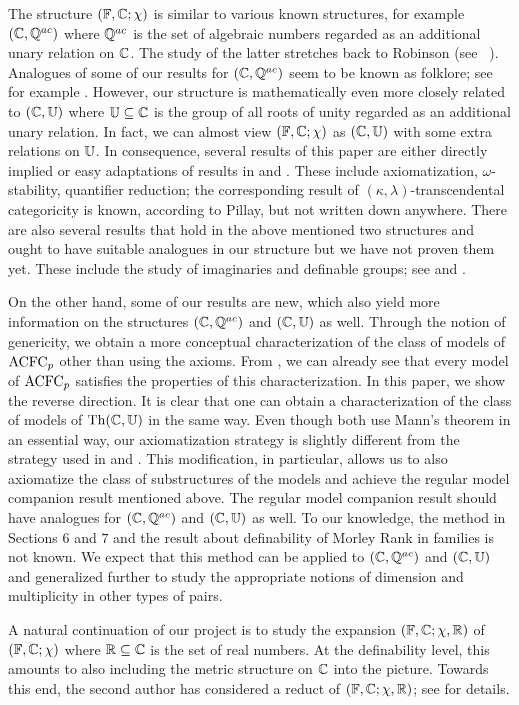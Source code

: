 \noindent
The structure $(\mathbb{F}, \mathbb{C}; \chi)$ is similar to various known structures, 
for example $(\mathbb{C}, \mathbb{Q}^{ac})$ where $\mathbb{Q}^{ac}$ is the set of algebraic numbers regarded as an additional unary relation on $\mathbb{C}$.
The study of the latter stretches back to Robinson (see ~\cite{Robinson}). Analogues of some of our results for $(\mathbb{C}, \mathbb{Q}^{ac})$ seem to be known as folklore; see
for example \cite{Louominpair}. However, our structure is mathematically even more closely related to $( \mathbb{C}, \mathbb{U})$ where $\mathbb{U} \subseteq \mathbb{C}$ is the group of all roots of unity regarded as an additional unary relation.
In fact, we can almost view $(\mathbb{F}, \mathbb{C}; \chi)$ as $( \mathbb{C}, \mathbb{U})$ with some 
extra relations on $\mathbb{U}$.
In consequence, several results of this paper are either directly implied or easy adaptations of results in \cite{Zilber} and \cite{DriesGun}.
These include axiomatization, $\omega$-stability, quantifier reduction; the corresponding result of $(\kappa, \lambda)$-transcendental categoricity is known, according to Pillay,  but not written down anywhere.
There are also several results that hold in the above mentioned two structures and ought to have suitable analogues in our structure but we have not proven them yet.
These include the study of imaginaries and definable groups;  see \cite{Pillay} and \cite{Haydar}.


\noindent On the other hand, some of our results are new, which also yield more information on the structures $(\mathbb{C}, \mathbb{Q}^{ac})$ and $( \mathbb{C}, \mathbb{U})$ as well.
Through the notion of genericity, we obtain a more conceptual characterization of the class of models of $\mathrm{ACFC}_p$ other than using the axioms.  From \cite{Zilber},
we can already see that every model of $\mathrm{ACFC}_p$  satisfies the properties of this characterization. In this paper, we show the reverse direction.
It is clear that one can obtain a characterization of the class of models of $\text{Th}( \mathbb{C}, \mathbb{U})$  in the same way.
Even though both use Mann's theorem in an essential way, our axiomatization strategy is slightly different from the strategy used in \cite{Zilber} and \cite{DriesGun}. 
This modification, in particular, allows us to also axiomatize the class of substructures of the models and achieve the regular model companion result mentioned above. 
The regular model companion result should have analogues for $( \mathbb{C}, \mathbb{Q}^{ac})$ and $(\mathbb{C}, \mathbb{U})$ as well. To our knowledge, the method in Sections $6$ and $7$ and the result about definability of Morley Rank in families is not known.
We expect that this method  can be applied to $( \mathbb{C}, \mathbb{Q}^{ac})$ and $(\mathbb{C}, \mathbb{U})$ and generalized further to study the appropriate notions of dimension and multiplicity in other types of pairs.

A natural continuation of our project is to study the expansion $(\mathbb{F}, \mathbb{C}; \chi, \mathbb{R})$ of $(\mathbb{F}, \mathbb{C}; \chi)$ where $\mathbb{R}\subseteq \mathbb{C}$ is the set of real numbers.  At the definability level, this amounts to also including the metric structure on $\mathbb{C}$ into the picture. Towards this end, the second author has considered a reduct of $(\mathbb{F}, \mathbb{C}; \chi, \mathbb{R})$; see \cite{Minh} for details.